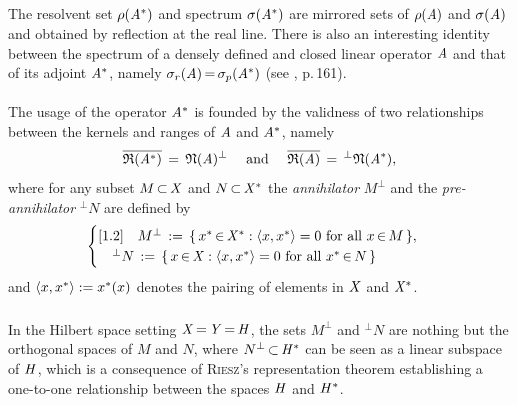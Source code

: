 \documentclass[11pt,twoside]{article}
\begin{document}
\subparagraph{} %
The resolvent set $\rho(\mathit{A}^*)$ and spectrum $\sigma(\mathit{A}^*)$
are mirrored sets of $\rho(\mathit{A})$ and $\sigma(\mathit{A})$
and obtained by reflection at the real line.
There is also an interesting identity between the spectrum
of a densely defined and closed linear operator $\mathit{A}$
and that of its adjoint $\mathit{A}^*$,
namely
$\sigma_r(\mathit{A}) {\,=\,} \sigma_p(\mathit{A}^*)$ (see \cite{EN}, p.\,161).

\paragraph{} %
The usage of the operator $\mathit{A}^*$ is founded by the validness
of two relationships between the kernels and ranges
of $\mathit{A}$ and $\mathit{A}^*$,
namely
\begin{equation}\label{ORTHOGONALITY_RELATIONS}
\overline{\mathfrak{R}(\mathit{A}^*) } \,=\, \mathfrak{N}(\mathit{A})^{\bot}
\quad \mbox{ and } \quad
\overline{\mathfrak{R}(\mathit{A}) } \,=\, ^{\bot}\mathfrak{N}(\mathit{A}^*),
\end{equation}
where for any subset $M {\,\subset\,} \mathit{X}$ and $N {\,\subset\,} \mathit{X}^*$
the \textit{annihilator}     $M^{\bot}$ and
the \textit{pre-annihilator} $^{\bot}N$
are defined by
\[
\begin{cases}[1.2]
\quad M^{\bot} \,:=\, \{\,x^*{\,\in\,} \mathit{X}^*: \langle x,x^* \rangle = 0
      \mbox{ for all } x   {\,\in\,} M \,\},\\
\quad ^{\bot}N \,:=\, \{\,x  {\,\in\,} \mathit{X}:   \langle x,x^* \rangle = 0
      \mbox{ for all } x^* {\,\in\,} N \,\}\\
\end{cases}
\]
and $\langle x,x^* \rangle := x^*(x)$ denotes the pairing of elements in $\mathit{X}$
and $\mathit{X}^*$.

\subparagraph{}
In the Hilbert space setting $\mathit{X} {\,=\,} \mathit{Y} {\,=\,} \mathit{H}$,
the sets $M^{\bot}$ and $^{\bot}N$ are nothing
but the orthogonal spaces of $M$ and $N$,
where $N^{\bot} {\,\subset\,} \mathit{H}^*$ can be seen as a linear subspace of $\mathit{H}$,
which is a consequence of \textsc{Riesz}'s representation theorem
establishing a one-to-one relationship
between the spaces $\mathit{H}$ and $\mathit{H}^*$.
\end{document}
